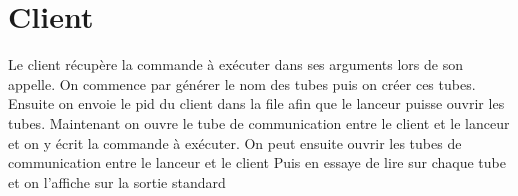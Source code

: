 \documentclass[12pt]{article}
\begin{document}
\section{Client}
Le client récupère la commande à exécuter dans ses arguments lors de son
appelle.
On commence par générer le nom des tubes puis on créer ces tubes. Ensuite on
envoie
le pid du client dans la file afin que le lanceur puisse ouvrir les tubes.
Maintenant on ouvre le tube de communication entre le client et le lanceur
et on y écrit la commande à exécuter.
On peut ensuite ouvrir les tubes de communication entre le lanceur et le client
Puis en essaye de lire sur chaque tube et on l'affiche sur la sortie standard
\end{document}
